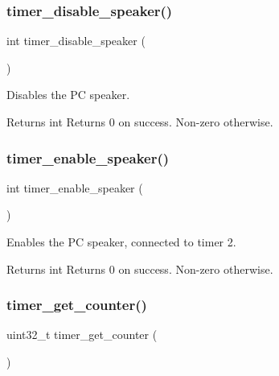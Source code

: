 \subsubsection{\texorpdfstring{timer\+\_\+disable\+\_\+speaker()}{timer\_disable\_speaker()}}
{\footnotesize\ttfamily int timer\+\_\+disable\+\_\+speaker (\begin{DoxyParamCaption}{ }\end{DoxyParamCaption})}



Disables the PC speaker. 

\begin{DoxyReturn}{Returns}
int Returns 0 on success. Non-\/zero otherwise. 
\end{DoxyReturn}
\mbox{\label{group__timer_ga6cfa415109f0af4e5e4aa62cdb445e4c}} 
\subsubsection{\texorpdfstring{timer\+\_\+enable\+\_\+speaker()}{timer\_enable\_speaker()}}
{\footnotesize\ttfamily int timer\+\_\+enable\+\_\+speaker (\begin{DoxyParamCaption}{ }\end{DoxyParamCaption})}



Enables the PC speaker, connected to timer 2. 

\begin{DoxyReturn}{Returns}
int Returns 0 on success. Non-\/zero otherwise. 
\end{DoxyReturn}
\mbox{\label{group__timer_ga2a20f5c67ca8817f632167d0a03467dd}} 
\subsubsection{\texorpdfstring{timer\+\_\+get\+\_\+counter()}{timer\_get\_counter()}}
{\footnotesize\ttfamily uint32\+\_\+t timer\+\_\+get\+\_\+counter (\begin{DoxyParamCaption}{ }\end{DoxyParamCaption})}


